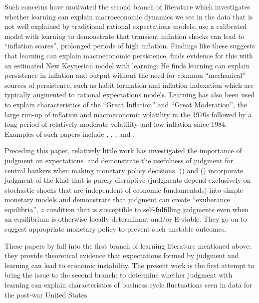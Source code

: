 \documentclass[12pt]{article}
\newcommand{\citee}[1]{\citet{#1}}
\begin{document}
Such concerns have motivated the second branch of literature which investigates whether learning can explain macroeconomic dynamics we see in the data that is not well explained by traditional rational expectations models.  \citee{ow2005} use a calibrated model with learning to demonstrate that transient inflation shocks can lead to ``inflation scares'', prolonged periods of high inflation.  Findings like these suggests that learning can explain macroeconomic persistence.  \citee{milani2007} finds evidence for this with an estimated New Keynesian model with learning.  He finds learning can explain persistence in inflation and output without the need for common ``mechanical'' sources of persistence, such as habit formation and inflation indexation which are typically augmented to rational expectations models.  Learning has also been used to explain characteristics of the ``Great Inflation'' and ``Great Moderation'', the large run-up of inflation and macroeconomic volatility in the 1970s followed by a long period of relatively moderate volatility and low inflation since 1984.  Examples of such papers include \citee{ow2005b}, \citee{primiceri2006}, \citee{bullardeusepi2005}, and \citee{bullardsingh}.

Preceding this paper, relatively little work has investigated the importance of judgment on expectations.  \citee{rsw1997} and \citee{svensson2005} demonstrate the usefulness of judgment for central bankers when making monetary policy decisions.  \citeauthor*{beh2008} (\citeyear{beh2008}) and (\citeyear{beh2010}) incorporate judgment of the kind that is purely disruptive (judgments depend exclusively on stochastic shocks that are independent of economic fundamentals) into simple monetary models and demonstrate that judgment can create ``exuberance equilibria'', a condition that is susceptible to self-fulfilling judgments even when an equilibrium is otherwise locally determinant and/or E-stable.  They go on to suggest appropriate monetary policy to prevent such unstable outcomes.   

These papers by \citeauthor*{beh2008} fall into the first branch of learning literature mentioned above: they provide theoretical evidence that expectations formed by judgment and learning can lead to economic instability.  The present work is the first attempt to bring the issue to the second branch: to determine whether judgment with learning can explain characteristics of business cycle fluctuations seen in data for the post-war United States. 
\end{document}
